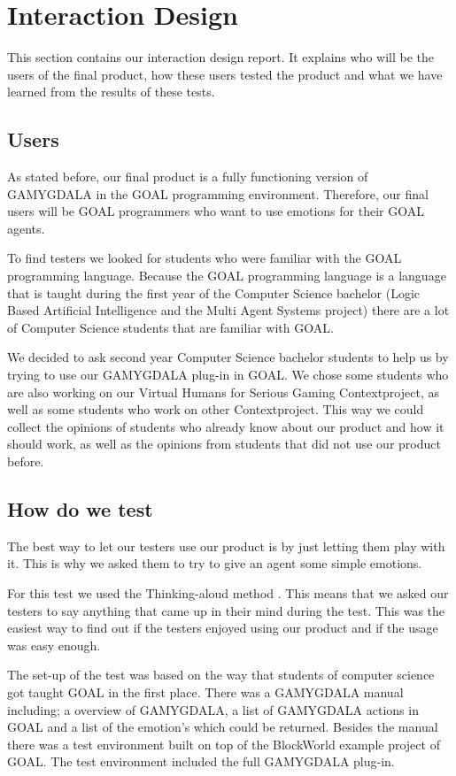 \section{Interaction Design}
This section contains our interaction design report. It explains who will be the users of the final product, how these users tested the product and what we have learned from the results of these tests.

\subsection{Users}
As stated before, our final product is a fully functioning version of GAMYGDALA in the GOAL programming environment. Therefore, our final users will be GOAL programmers who want to use emotions for their GOAL agents. \par
To find testers we looked for students who were familiar with the GOAL programming language. Because the GOAL programming language is a language that is taught during the first year of the Computer Science bachelor (Logic Based Artificial Intelligence and the Multi Agent Systems project) there are a lot of Computer Science students that are familiar with GOAL. \par
We decided to ask second year Computer Science bachelor students to help us by trying to use our GAMYGDALA plug-in in GOAL. We chose some students who are also working on our Virtual Humans for Serious Gaming Contextproject, as well as some students who work on other Contextproject. This way we could collect the opinions of students who already know about our product and how it should work, as well as the opinions from students that did not use our product before.

\subsection{How do we test}
The best way to let our testers use our product is by just letting them play with it. This is why we asked them to try to give an agent some simple emotions. \par
For this test we used the Thinking-aloud method \citep{thinking-aloud}. This means that we asked our testers to say anything that came up in their mind during the test. This was the easiest way to find out if the testers enjoyed using our product and if the usage was easy enough.\par
The set-up of the test was based on the way that students of computer science got taught GOAL in the first place. There was a GAMYGDALA manual including; a overview of GAMYGDALA, a list of GAMYGDALA actions in GOAL and a list of the emotion's which could be returned. Besides the manual there was a test environment built on top of the BlockWorld example project of GOAL. The test environment included the full GAMYGDALA plug-in.


